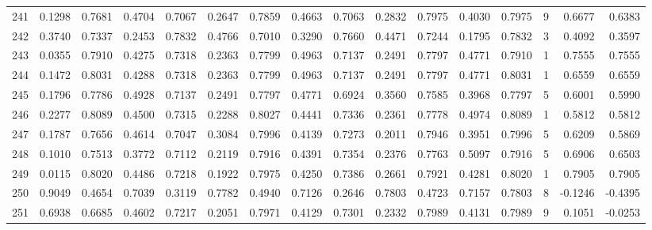 \begin{tabular}{lrrrrrrrrrrrrrrr}
241 &      0.1298 &  0.7681 &  0.4704 &  0.7067 &  0.2647 &  0.7859 &  0.4663 &  0.7063 &  0.2832 &  0.7975 &   0.4030 &     0.7975 &      9 &                    0.6677 &                     0.6383 \\
242 &      0.3740 &  0.7337 &  0.2453 &  0.7832 &  0.4766 &  0.7010 &  0.3290 &  0.7660 &  0.4471 &  0.7244 &   0.1795 &     0.7832 &      3 &                    0.4092 &                     0.3597 \\
243 &      0.0355 &  0.7910 &  0.4275 &  0.7318 &  0.2363 &  0.7799 &  0.4963 &  0.7137 &  0.2491 &  0.7797 &   0.4771 &     0.7910 &      1 &                    0.7555 &                     0.7555 \\
244 &      0.1472 &  0.8031 &  0.4288 &  0.7318 &  0.2363 &  0.7799 &  0.4963 &  0.7137 &  0.2491 &  0.7797 &   0.4771 &     0.8031 &      1 &                    0.6559 &                     0.6559 \\
245 &      0.1796 &  0.7786 &  0.4928 &  0.7137 &  0.2491 &  0.7797 &  0.4771 &  0.6924 &  0.3560 &  0.7585 &   0.3968 &     0.7797 &      5 &                    0.6001 &                     0.5990 \\
246 &      0.2277 &  0.8089 &  0.4500 &  0.7315 &  0.2288 &  0.8027 &  0.4441 &  0.7336 &  0.2361 &  0.7778 &   0.4974 &     0.8089 &      1 &                    0.5812 &                     0.5812 \\
247 &      0.1787 &  0.7656 &  0.4614 &  0.7047 &  0.3084 &  0.7996 &  0.4139 &  0.7273 &  0.2011 &  0.7946 &   0.3951 &     0.7996 &      5 &                    0.6209 &                     0.5869 \\
248 &      0.1010 &  0.7513 &  0.3772 &  0.7112 &  0.2119 &  0.7916 &  0.4391 &  0.7354 &  0.2376 &  0.7763 &   0.5097 &     0.7916 &      5 &                    0.6906 &                     0.6503 \\
249 &      0.0115 &  0.8020 &  0.4486 &  0.7218 &  0.1922 &  0.7975 &  0.4250 &  0.7386 &  0.2661 &  0.7921 &   0.4281 &     0.8020 &      1 &                    0.7905 &                     0.7905 \\
250 &      0.9049 &  0.4654 &  0.7039 &  0.3119 &  0.7782 &  0.4940 &  0.7126 &  0.2646 &  0.7803 &  0.4723 &   0.7157 &     0.7803 &      8 &                   -0.1246 &                    -0.4395 \\
251 &      0.6938 &  0.6685 &  0.4602 &  0.7217 &  0.2051 &  0.7971 &  0.4129 &  0.7301 &  0.2332 &  0.7989 &   0.4131 &     0.7989 &      9 &                    0.1051 &                    -0.0253 \\

\end{tabular}
